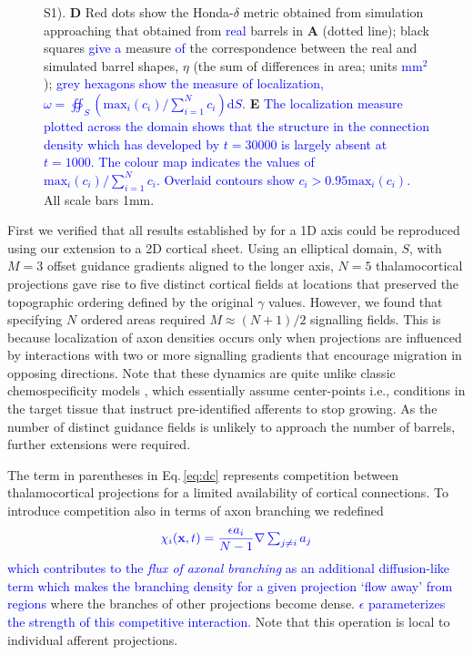 \documentclass[9pt,lineno]{elife}
\newcommand{\cmnt}[1]{\textcolor{blue}{#1}}
\newcommand{\mb}[1]{\mathbf{#1}}
\begin{document}
\begin{figure}
\begin{fullwidth}
{      S1). \textbf{D} Red dots show the Honda-$\delta$ metric obtained from
      simulation approaching that obtained from \cmnt{real} barrels in \textbf{A} (dotted
      line); black squares \cmnt{give a} measure \cmnt{of} the correspondence
      between the real and
      simulated barrel shapes, $\eta$ (the sum of differences in
      area; units \cmnt{mm$^2$});
      \cmnt{grey hexagons show the measure of localization, $\omega =
        \oiint_{S} \left( \mathrm{max}_i(c_i)/\sum_{i=1}^{N} c_i\right) \mathrm{d}S$. }
      \textbf{E} \cmnt{The localization measure plotted across the domain
        shows that the structure in the connection density which has developed
        by $t=30000$ is largely absent at $t=1000$. The
        colour map
        indicates the values of  $\mathrm{max}_i(c_i)/\sum_{i=1}^{N} c_i$. Overlaid
        contours show $c_i > 0.95 \mathrm{max}_i(c_i)$.} All scale bars 1mm.}
    \label{fig:main}
  \end{fullwidth}
\end{figure}

First we verified that all results established by \cite{karbowski_model_2004}
for a 1D axis could be reproduced using our extension to a 2D cortical
sheet. Using an elliptical domain, $S$, with $M=3$ offset guidance gradients
aligned to the longer axis, $N=5$ thalamocortical projections gave rise to
five distinct cortical fields at locations that preserved the topographic
ordering defined by the original $\gamma$ values. However, we found that
specifying $N$ ordered areas required $M\approx (N+1)/2$ signalling
fields. This is because localization of axon densities occurs only when
projections are influenced by interactions with two or more signalling
gradients that encourage migration in opposing directions. Note that these
dynamics are quite unlike classic chemospecificity models
\citep{sperry_chemoaffinity_1963}, which essentially assume center-points
i.e., conditions in the target tissue that instruct pre-identified afferents
to stop growing. As the number of distinct guidance fields is unlikely to
approach the number of barrels, further extensions were required.

The term in parentheses in Eq.\,\ref{eq:dc} represents competition between
thalamocortical projections for a limited availability of cortical
connections. To introduce competition also in terms of axon branching we
redefined
%
\begin{equation} \label{eq:comp}
  \color{blue}
  \chi_i(\mb{x}, t) = \frac{\epsilon a_i}{N-1} \nabla \textstyle\sum_{j\ne i}{a_j}
  \color{black}
\end{equation}
%
\cmnt{which contributes to the \emph{flux of axonal branching} as an
  additional diffusion-like term which makes the branching density for a given
  projection `flow away' from regions} where the branches of other projections
become dense. \cmnt{$\epsilon$ parameterizes the strength of this competitive
  interaction.} Note that this operation is local to individual afferent
projections.
\end{document}
